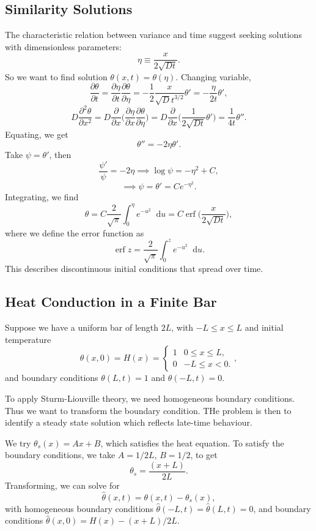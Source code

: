 \documentclass[12pt]{article}
\DeclareMathOperator{\erf}{erf}
\newcommand{\diff}{\mathop{}\!\mathrm{d}}
\theoremstyle{definition}
\theoremstyle{remark}
\begin{document}
\subsection{Similarity Solutions}%
\label{sub:similarity_solutions}

The characteristic relation between variance and time suggest seeking solutions with dimensionless parameters:
\[
	\eta \equiv \frac{x}{2 \sqrt{Dt}}
.\]
So we want to find solution $\theta(x, t) = \theta(\eta)$. Changing variable,
\[
	\frac{\partial \theta}{\partial t} = \frac{\partial \eta}{\partial t} \frac{\partial \theta}{\partial \eta} = -\frac{1}{2}\frac{x}{\sqrt D t^{3/2}} \theta' = - \frac{\eta}{2t} \theta'
,\]
\[
	D \frac{\partial^2 \theta}{\partial x^2} = D \frac{\partial}{\partial x} \biggl( \frac{\partial \eta}{\partial x} \frac{\partial \theta}{\partial \eta} \biggr) = D \frac{\partial}{\partial x} \biggl( \frac{1}{2 \sqrt{Dt}} \theta' \biggr) = \frac{1}{4t} \theta''
.\]
Equating, we get
\[
\theta'' = - 2 \eta \theta'
.\]
Take $\psi = \theta'$, then
\[
\frac{\psi'}{\psi} = - 2 \eta \implies \log \psi = - \eta^2 + C
,\]
\[
\implies \psi = \theta' = C e^{-\eta^2}
.\]
Integrating, we find
\[
	\theta = C \frac{2}{\sqrt \pi} \int_{0}^{\eta} e^{-u^2} \diff u = C \erf \biggl( \frac{x}{2 \sqrt{Dt}} \biggr)
,\]
where we define the error function as
\[
\erf z = \frac{2}{\sqrt \pi} \int_{0}^{z} e^{-u^2}\diff u
.\]
This describes discontinuous initial conditions that spread over time.

\subsection{Heat Conduction in a Finite Bar}%
\label{sub:heat_conduction_in_a_finite_bar}

Suppose we have a uniform bar of length $2L$, with $-L \leq x \leq L$ and initial temperature
\[
	\theta(x, 0) = H(x) =
	\begin{cases}
		1 & 0 \leq x \leq L, \\
		0 & -L \leq x < 0.
	\end{cases}
,\]
and boundary conditions $\theta(L, t) = 1$ and $\theta(-L, t) = 0$.

To apply Sturm-Liouville theory, we need homogeneous boundary conditions. Thus we want to transform the boundary condition. THe problem is then to identify a steady state solution which reflects late-time behaviour.

We try $\theta_s(x) = Ax + B$, which satisfies the heat equation. To satisfy the boundary conditions, we take $A = 1/2L$, $B = 1/2$, to get
\[
	\theta_s = \frac{(x + L)}{2L}
.\]
Transforming, we can solve for
\[
	\hat \theta(x, t) = \theta(x, t) - \theta_s(x)
,\]
with homogeneous boundary conditions $\hat \theta(-L, t) = \hat \theta(L, t) = 0$, and boundary conditions $\hat \theta(x, 0) = H(x) - (x+L)/2L$.
\end{document}
